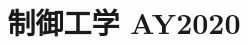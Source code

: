 \documentclass[11pt,a4paper]{article}
\title{制御工学 AY2020}
\author{}
\date{}
\begin{document}
\maketitle


\bigskip

\end{document}
